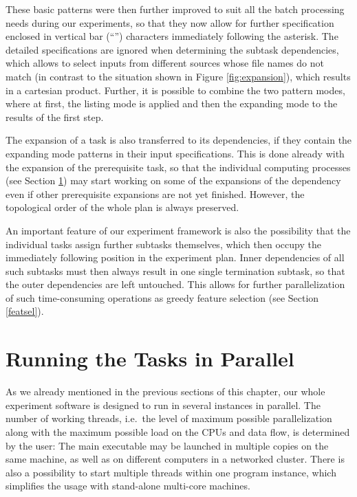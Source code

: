 \documentclass[12pt,notitlepage,a4paper]{report}
\begin{document}
These basic patterns were then further improved to suit all the batch processing needs during our experiments, so that they now allow for further specification enclosed in vertical bar (``\textbar'') characters immediately following the asterisk. The detailed specifications are ignored when determining the subtask dependencies, which allows to select inputs from different sources whose file names do not match (in contrast to the situation shown in Figure \ref{fig:expansion}), which results in a cartesian product. Further, it is possible to combine the two pattern modes, where at first, the listing mode is applied and then the expanding mode to the results of the first step.

The expansion of a task is also transferred to its dependencies, if they contain the expanding mode patterns in their input specifications. This is done already with the expansion of the prerequisite task, so that the individual computing processes (see Section \ref{parallel}) may start working on some of the expansions of the dependency even if other prerequisite expansions are not yet finished. However, the topological order of the whole plan is always preserved.

An important feature of our experiment framework is also the possibility that the individual tasks assign further subtasks themselves, which then occupy the immediately following position in the experiment plan. Inner dependencies of all such subtasks must then always result in one single termination subtask, so that the outer dependencies are left untouched. This allows for further parallelization of such time-consuming operations as greedy feature selection (see Section \ref{featsel}).

\section{Running the Tasks in Parallel}\label{parallel}

As we already mentioned in the previous sections of this chapter, our whole experiment software is designed to run in several instances in parallel. The number of working threads, i.e.\ the level of maximum possible parallelization along with the maximum possible load on the CPUs and data flow, is determined by the user: The main executable may be launched in multiple copies on the same machine, as well as on different computers in a networked cluster. There is also a possibility to start multiple threads within one program instance, which simplifies the usage with stand-alone multi-core machines.
\end{document}
